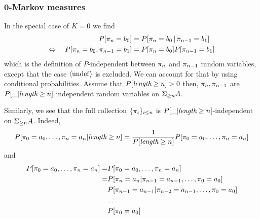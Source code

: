\documentclass[11pt]{article}
\begin{document}
\subsubsection{0-Markov measures}
In the special case of $K=0$ we find
\begin{align*}
  P[{\pi_{n}} = b_0 ] &= P[ {\pi_{n}} = b_0 \,|\, {\pi_{n-1}} = b_1] \\
  \Leftrightarrow \quad P[ {\pi_{n}} = b_0,  {\pi_{n-1}} = b_1 ] 
                   &= P[ {\pi_{n}} = b_0 ] P[{\pi_{n-1}} = b_1 ]
\end{align*}
which is the definition of $P$-independent between ${\pi_{n}}$ and
${\pi_{n-1}}$ random variables, except that the case $\langle \mathrm{undef} \rangle$ is
excluded. We can account for that by using conditional probabilities.
Assume that $P[\text{\it length} \geq n] > 0$ then, ${\pi_{n}}, {\pi_{n-1}}$ are
$P[\_|\text{\it length} \geq n]$ independent random variables on $\Sigma_{\geq n} A$.

Similarly, we see that the full collection $\{ {\pi_{i}} \}_{i \leq n}$ 
is $P[\_|\text{\it length} \geq n]$-independent on $\Sigma_{\geq n} A$. Indeed, 
\[     P[ {\pi_{0}} = a_0, \dots, {\pi_{n}} = a_n | \text{\it length} \geq n]
  = \frac{1}{P[\text{\it length} \geq n]} P[ {\pi_{0}} = a_0, \dots, {\pi_{n}} = a_n ] \]
and
\begin{align*}
 P[ {\pi_{0}} = a_0, \dots, {\pi_{n}} = a_n] = &P[ {\pi_{0}} = a_0, \dots, {\pi_{n}} = a_n ] \\
  = & P[ {\pi_{n}} = a_n     | {\pi_{n-1}}=a_{n-1}, \dots, {\pi_{0}} = a_0 ]  \\
    & P[{\pi_{n-1}} = a_{n-1}| {\pi_{n-2}}=a_{n-1}, \dots, {\pi_{0}} = a_0 ]  \\
    & \dots \\
    & P[{\pi_{0}} = a_{0}]
\end{align*}
\end{document}
